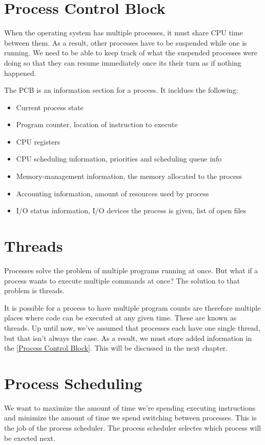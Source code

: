\documentclass{article}
\begin{document}
\section{Process Control Block}
When the operating system has multiple processes, it must share CPU time
between them. As a result, other processes have to be suspended while one is
running. We need to be able to keep track of what the suspended processes were
doing so that they can resume immediately once its their turn as if nothing
happened.

The PCB is an information section for a process. It incldues the following:

\begin{itemize}
	\item Current process state
	\item Program counter, location of instruction to execute
	\item CPU registers
	\item CPU scheduling information, priorities and scheduling queue info
	\item Memory-management information, the memory allocated to the process
	\item Accounting information, amount of resources used by process
	\item I/O status information, I/O devices the process is given, list of
		open files
\end{itemize}

\section{Threads}
Processes solve the problem of multiple programs running at once. But what if a
process wants to execute multiple commands at once? The solution to that
problem is threads.

It is possible for a process to have multiple program counts are therefore
multiple places where code can be executed at any given time. These are known
as threads. Up until now, we've assumed that processes each have one single
thread, but that isn't always the case. As a result, we must store added
information in the \ref{Process Control Block}. This will be discussed in the
next chapter.

\section{Process Scheduling}
We want to maximize the amount of time we're spending executing instructions
and minimize the amount of time we spend switching between processes. This is
the job of the process scheduler. The process scheduler selectes which process
will be exected next.
\end{document}
